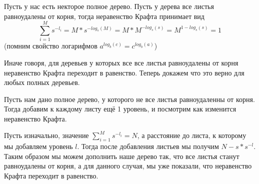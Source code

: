 \documentclass[../main.tex]{subfiles}
\begin{document}
   Пусть у нас есть некторое полное дерево. Пусть у дерева все листья равноудалены от корня, тогда неравенство Крафта принимает вид 
   $$\sum\limits_{i=1}^{M}s^{-l_i} = M*s^{-log_s(M)} = M*M^{-log_s(s)} = M^{1-log_s(s)} = 1 $$ 
   (помним свойство логарифмов $a^{log_b(c)}=c^{log_b(a)}$)
   
   Иначе говоря, для деревьев у которых все все листья равноудалены от корня неравенство Крафта переходит в равенство. Теперь докажем что это верно для любых полных деревьев.
   
   Пусть нам дано полное дерево, у которого не все листья равноудаленны от корня. Тогда добавим к каждому листу ещё 1 уровень, и посмотрим как изменится неравенство Крафта.
   
   Пусть изначально, значение $\sum\limits_{i=1}^{M}s^{-l_i}=N$, а расстояние до листа, к которому мы добавляем \newline уровень $l$. Тогда после добавления листьев мы получим $N-s*s^{-l}$. Таким образом мы можем дополнить наше дерево так, что все листья станут равноудалены от корня, а для данного случая, мы уже показали, что неравенство Крафта переходит в равенство.
\end{document}
